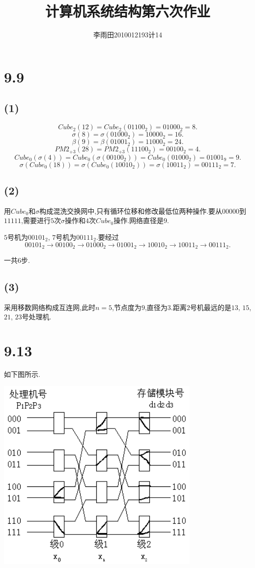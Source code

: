 \documentclass[adobefonts, nocap]{ctexart}
\begin{document}
  \title{计算机系统结构第六次作业}
  \author{李雨田\hspace{1em}2010012193\hspace{1em}计14}
  \maketitle
  \section*{9.9}
    \subsection*{(1)}
      \[
        Cube_{2}(12)=Cube_{2}(01100_{2})=01000_{2}=8.
      \]
      \[
        \sigma(8)=\sigma(01000_{2})=10000_{2}=16.
      \]
      \[
        \beta(9)=\beta(01001_{2})=11000_{2}=24.
      \]
      \[
        PM2_{+3}(28)=PM2_{+3}(11100_{2})=00100_{2}=4.
      \]
      \[
        Cube_{0}(\sigma(4))=Cube_{0}(\sigma(00100_{2}))=Cube_{0}(01000_{2})=01001_{9}=9.
      \]
      \[
        \sigma(Cube_{0}(18))=\sigma(Cube_{0}(10010_{2}))=\sigma(10011_{2})=00111_{2}=7.
      \]
    \subsection*{(2)}
      用$Cube_{0}$和$\sigma$构成混洗交换网中,只有循环位移和修改最低位两种操作.要从$00000$到$11111$,需要进行$5$次$\sigma$操作和$4$次$Cube_{0}$操作.网络直径是$9$.

      $5$号机为$00101_{2}$, $7$号机为$00111_{2}$.要经过
      \[
        00101_{2}\rightarrow 00100_{2}\rightarrow 01000_{2}\rightarrow 01001_{2}\rightarrow 10010_{2}\rightarrow 10011_{2}\rightarrow 00111_{2}.
      \]

      一共$6$步.
    \subsection*{(3)}
      采用移数网络构成互连网,此时$n=5$,节点度为$9$,直径为$3$.距离$2$号机最远的是$13$, $15$, $21$, $23$号处理机.
  \section*{9.13}
    如下图所示.

    \begin{center}
      \includegraphics[width=10cm]{1.png}
    \end{center}
\end{document}
